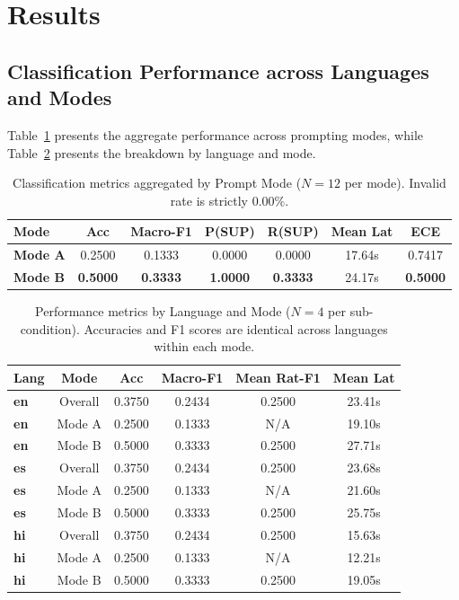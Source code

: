 \documentclass[10pt,twocolumn]{article}
\begin{document}
\section{Results}
\label{sec:results}

\subsection{Classification Performance across Languages and Modes}
Table~\ref{tab:metrics_prompt} presents the aggregate performance across prompting modes, while Table~\ref{tab:metrics_lang} presents the breakdown by language and mode.

\begin{table}[ht]
\centering
\small
\caption{Classification metrics aggregated by Prompt Mode ($N=12$ per mode). Invalid rate is strictly $0.00\%$.}
\label{tab:metrics_prompt}
\begin{tabular}{lcccccc}
\toprule
\textbf{Mode} & \textbf{Acc} & \textbf{Macro-F1} & \textbf{P(SUP)} & \textbf{R(SUP)} & \textbf{Mean Lat} & \textbf{ECE} \\
\midrule
\textbf{Mode A} & 0.2500 & 0.1333 & 0.0000 & 0.0000 & 17.64s & 0.7417 \\
\textbf{Mode B} & \textbf{0.5000} & \textbf{0.3333} & \textbf{1.0000} & \textbf{0.3333} & 24.17s & \textbf{0.5000} \\
\bottomrule
\end{tabular}
\end{table}

\begin{table}[ht]
\centering
\small
\caption{Performance metrics by Language and Mode ($N=4$ per sub-condition). Accuracies and F1 scores are identical across languages within each mode.}
\label{tab:metrics_lang}
\begin{tabular}{lccccc}
\toprule
\textbf{Lang} & \textbf{Mode} & \textbf{Acc} & \textbf{Macro-F1} & \textbf{Mean Rat-F1} & \textbf{Mean Lat} \\
\midrule
\textbf{en} & Overall & 0.3750 & 0.2434 & 0.2500 & 23.41s \\
\textbf{en} & Mode A & 0.2500 & 0.1333 & N/A & 19.10s \\
\textbf{en} & Mode B & 0.5000 & 0.3333 & 0.2500 & 27.71s \\
\midrule
\textbf{es} & Overall & 0.3750 & 0.2434 & 0.2500 & 23.68s \\
\textbf{es} & Mode A & 0.2500 & 0.1333 & N/A & 21.60s \\
\textbf{es} & Mode B & 0.5000 & 0.3333 & 0.2500 & 25.75s \\
\midrule
\textbf{hi} & Overall & 0.3750 & 0.2434 & 0.2500 & 15.63s \\
\textbf{hi} & Mode A & 0.2500 & 0.1333 & N/A & 12.21s \\
\textbf{hi} & Mode B & 0.5000 & 0.3333 & 0.2500 & 19.05s \\
\bottomrule
\end{tabular}
\end{table}
\end{document}
